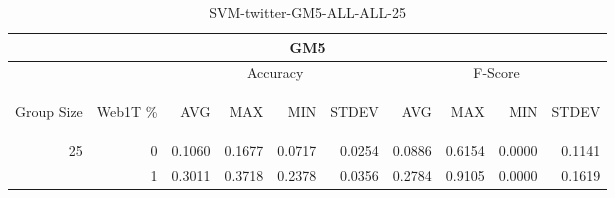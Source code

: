 \begin{center}
\begin{table}[htbp] 
 \begin{center}
\begin{tabular}{ | r | r | r | r | r | r | r | r | r | r |}
\hline
\multicolumn{10}{|c|}{GM5}\\
\hline
 & & \multicolumn{4}{|c|}{Accuracy} & \multicolumn{4}{|c|}{F-Score}\\ \cline{3-10}
\begin{sideways}Group Size\end{sideways} & \begin{sideways}Web1T \%\end{sideways} & \begin{sideways}AVG\end{sideways} & \begin{sideways}MAX\end{sideways} & \begin{sideways}MIN\end{sideways} & \begin{sideways}STDEV\end{sideways} & \begin{sideways}AVG\end{sideways} & \begin{sideways}MAX\end{sideways} & \begin{sideways}MIN\end{sideways} & \begin{sideways}STDEV\end{sideways}\\
\hline
\multirow{1}{*}{25}
 & 0 & 0.1060 & 0.1677 & 0.0717 & 0.0254 & 0.0886 & 0.6154 & 0.0000 & 0.1141\\ \cline{2-10}
 & 1 & 0.3011 & 0.3718 & 0.2378 & 0.0356 & 0.2784 & 0.9105 & 0.0000 & 0.1619\\ \cline{2-10}
\hline
\end{tabular}
\caption{SVM-twitter-GM5-ALL-ALL-25}
\label{table:SVM-twitter-GM5-ALL-ALL-25}
\end{center}
 \end{table}
\end{center}

